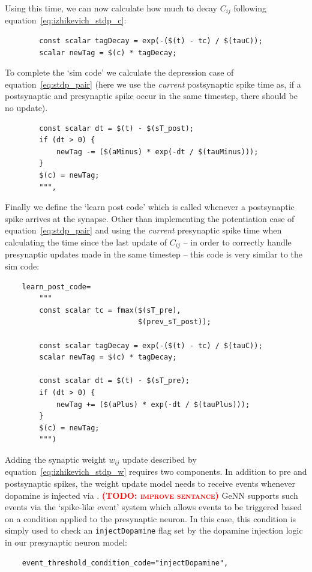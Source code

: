 \documentclass[utf8]{frontiersSCNS} %
\newcommand{\todo}[1]{\textbf{\textsc{\textcolor{red}{(TODO: #1)}}}}
\begin{document}
Using this time, we can now calculate how much to decay $C_{ij}$ following equation~\ref{eq:izhikevich_stdp_c}:
%
\begin{lstlisting}       
        const scalar tagDecay = exp(-($(t) - tc) / $(tauC));
        scalar newTag = $(c) * tagDecay;
\end{lstlisting}
%
To complete the `sim code' we calculate the depression case of equation~\ref{eq:stdp_pair} (here we use the \emph{current} postsynaptic spike time as, if a postsynaptic and presynaptic spike occur in the same timestep, there should be no update).
\begin{lstlisting}
        const scalar dt = $(t) - $(sT_post);
        if (dt > 0) {
            newTag -= ($(aMinus) * exp(-dt / $(tauMinus)));
        }
        $(c) = newTag;
        """,
\end{lstlisting}
%
Finally we define the `learn post code' which is called whenever a postsynaptic spike arrives at the synapse.
Other than implementing the potentiation case of equation~\ref{eq:stdp_pair} and using the \emph{current} presynaptic spike time when calculating the time since the last update of $C_{ij}$ -- in order to correctly handle presynaptic updates made in the same timestep -- this code is very similar to the sim code:
\begin{lstlisting}
    learn_post_code=
        """
        const scalar tc = fmax($(sT_pre), 
                               $(prev_sT_post));
        
        const scalar tagDecay = exp(-($(t) - tc) / $(tauC));
        scalar newTag = $(c) * tagDecay;
        
        const scalar dt = $(t) - $(sT_pre);
        if (dt > 0) {
            newTag += ($(aPlus) * exp(-dt / $(tauPlus)));
        }
        $(c) = newTag;
        """)
\end{lstlisting}
%
Adding the synaptic weight $w_{ij}$ update described by equation~\ref{eq:izhikevich_stdp_w} requires two components.
In addition to pre and postsynaptic spikes, the weight update model needs to receive events whenever dopamine is injected via .
\todo{improve sentance}
GeNN supports such events via the `spike-like event' system which allows events to be triggered based on a condition applied to the presynaptic neuron.
In this case, this condition is simply used to check an \lstinline{injectDopamine} flag set by the dopamine injection logic in our presynaptic neuron model:
%
\begin{lstlisting}
    event_threshold_condition_code="injectDopamine",
\end{lstlisting}
\end{document}
